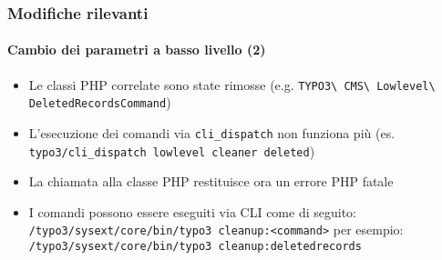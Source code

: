 \begin{frame}[fragile]
	\frametitle{Modifiche rilevanti}
	\framesubtitle{Cambio dei parametri a basso livello (2)}


	\begin{itemize}
		\item Le classi PHP correlate sono state rimosse\newline
			\smaller(e.g. \texttt{TYPO3\textbackslash
				CMS\textbackslash
				Lowlevel\textbackslash
				DeletedRecordsCommand})
			\normalsize

		\item L'esecuzione dei comandi via \texttt{cli\_dispatch} non funziona più\newline
			\smaller(es. \texttt{typo3/cli\_dispatch lowlevel cleaner deleted})\normalsize
		\item La chiamata alla classe PHP restituisce ora un errore PHP fatale

		\item I comandi possono essere eseguiti via CLI come di seguito:\newline
			\smaller\texttt{/typo3/sysext/core/bin/typo3 cleanup:<command>}\normalsize\newline
			per esempio:\newline
			\smaller\texttt{/typo3/sysext/core/bin/typo3 cleanup:deletedrecords}\normalsize

	\end{itemize}

\end{frame}




